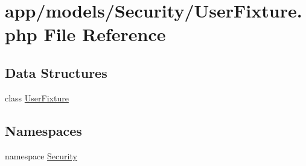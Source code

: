 \hypertarget{_user_fixture_8php}{\section{app/models/\-Security/\-User\-Fixture.php File Reference}
\label{_user_fixture_8php}
}
\subsection*{Data Structures}
\begin{DoxyCompactItemize}
\item 
class \hyperlink{class_security_1_1_user_fixture}{User\-Fixture}
\end{DoxyCompactItemize}
\subsection*{Namespaces}
\begin{DoxyCompactItemize}
\item 
namespace \hyperlink{namespace_security}{Security}
\end{DoxyCompactItemize}
